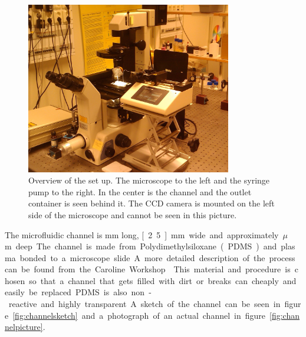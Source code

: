 \begin{figure}[H]
\centering
\includegraphics[width=0.8\textwidth]{figures/method/ExperimentalOverview.jpg}
\caption{Overview of the set up. The microscope to the left and the syringe pump to the right. In the center is the channel and the outlet container is seen behind it. The CCD camera is mounted on the left side of the microscope and cannot be seen in this picture.}\label{fig:setuppicture}
\end{figure}


The microfluidic channel is \unit[40]{mm} long, \unit[2.5]{mm} wide and approximately \unit[150]{$\mu$m} deep. The channel is made from Polydimethylsiloxane (PDMS) and plasma bonded to a microscope slide. A more detailed description of the process can be found from the Caroline Workshop \cite{PDMS}. This material and procedure is chosen so that a channel that gets filled with dirt or breaks can cheaply and easily be replaced. PDMS is also non-reactive and highly transparent. A sketch of the channel can be seen in figure \ref{fig:channelsketch} and a photograph of an actual channel in figure \ref{fig:channelpicture}. 

